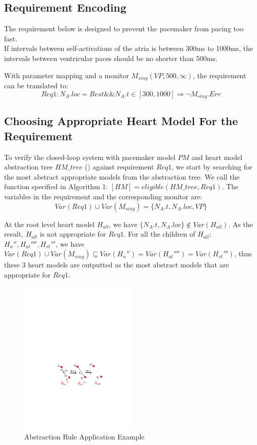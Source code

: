 \subsection{Requirement Encoding}
The requirement below is designed to prevent the pacemaker from pacing too fast.\\
\textsf{If intervals between self-activations of the atria is between 300ms to 1000ms, the intervals between ventricular paces should be no shorter than 500ms.}

With parameter mapping and a monitor $M_{sing}(VP,500,\infty)$, the requirement can be translated to:
$$Req1: N_A.loc=Rest \&\& N_A.t\in [300,1000] \Rightarrow \neg M_{sing}.Err$$

 \subsection{Choosing Appropriate Heart Model For the Requirement}
To verify the closed-loop system with pacemaker model $PM$ and heart model abstraction tree $HM\_tree$ () against requirement $Req1$, we start by searching for the most abstract appropriate models from the abstraction tree. We call the function specified in Algorithm 1: $[HM]=eligible(HM\_tree,Req1)$. The variables in the requirement and the corresponding monitor are:
$$Var(Req1)\cup Var(M_{sing})=\{N_A.t,N_A.loc, VP\}$$

At the root level heart model $H_{all}$, we have $\{N_A.t,N_A.loc\}\not\in Var(H_{all})$. As the result, $H_{all}$ is not appropriate for $Req1$. For all the children of $H_{all}$: $H_n'',H_{at}'''',H_{vt}'''$, we have $Var(Req1)\cup Var(M_{sing})\subseteq Var(H_n'')=Var(H_{at}'''')=Var(H_{vt}''')$, thus these 3 heart models are outputted as the most abstract models that are appropriate for $Req1$.
\begin{figure}[!t]
	\centering
	\includegraphics[width=0.5\textwidth]{figs/abs_sim.pdf}
	\caption{\small Abstraction Rule Application Example}
	\label{fig:abs_exam}
\end{figure}
